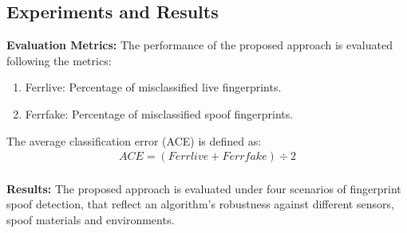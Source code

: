 \subsection{Experiments and Results}
\textbf{Evaluation Metrics:}
 The performance of the proposed approach is evaluated following the metrics:
    \begin{enumerate}
	\item Ferrlive: Percentage of misclassified live fingerprints. 
	\item Ferrfake: Percentage of misclassified spoof fingerprints.
     \end{enumerate}  The average classification error (ACE) is defined as:
        \begin{eqnarray}
          ACE =  (Ferrlive + Ferrfake) \div 2 
        \end{eqnarray} 
 \\
\textbf{Results:} 
The proposed approach is evaluated under four scenarios of fingerprint spoof detection, that reflect an algorithm's robustness against different sensors, spoof materials and environments. 
